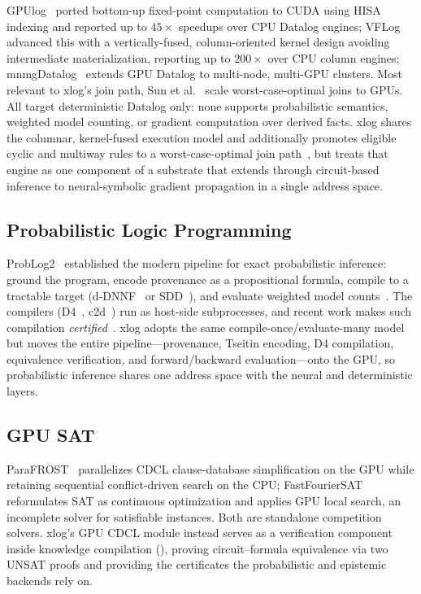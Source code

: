 GPUlog~\cite{gpulog} ported bottom-up fixed-point computation to CUDA using HISA indexing and reported up to $45\times$ speedups over CPU Datalog engines; VFLog~\cite{vflog} advanced this with a vertically-fused, column-oriented kernel design avoiding intermediate materialization, reporting up to $200\times$ over CPU column engines; mnmgDatalog~\cite{mnmgdatalog} extends GPU Datalog to multi-node, multi-GPU clusters. Most relevant to xlog's join path, Sun et al.~\cite{sungpuwcoj} scale worst-case-optimal joins to GPUs. All target deterministic Datalog only: none supports probabilistic semantics, weighted model counting, or gradient computation over derived facts. xlog shares the columnar, kernel-fused execution model and additionally promotes eligible cyclic and multiway rules to a worst-case-optimal join path~\cite{ngo2018wcoj,veldhuizen2014leapfrog,wang2023freejoin}, but treats that engine as one component of a substrate that extends through circuit-based inference to neural-symbolic gradient propagation in a single address space.

\subsection{Probabilistic Logic Programming}

ProbLog2~\cite{problog2} established the modern pipeline for exact probabilistic inference: ground the program, encode provenance as a propositional formula, compile to a tractable target (d-DNNF~\cite{darwiche2001dnnf} or SDD~\cite{sdd}), and evaluate weighted model counts~\cite{chaviraDarwiche2008}. The compilers (D4~\cite{d4compiler}, c2d~\cite{c2d}) run as host-side subprocesses, and recent work makes such compilation \emph{certified}~\cite{capelli2019}. xlog adopts the same compile-once/evaluate-many model but moves the entire pipeline---provenance, Tseitin encoding, D4 compilation, equivalence verification, and forward/backward evaluation---onto the GPU, so probabilistic inference shares one address space with the neural and deterministic layers.

\subsection{GPU SAT}

ParaFROST~\cite{parafrost} parallelizes CDCL clause-database simplification on the GPU while retaining sequential conflict-driven search on the CPU; FastFourierSAT~\cite{fastfouriersat} reformulates SAT as continuous optimization and applies GPU local search, an incomplete solver for satisfiable instances. Both are standalone competition solvers. xlog's GPU CDCL module instead serves as a verification component inside knowledge compilation (), proving circuit--formula equivalence via two UNSAT proofs and providing the certificates the probabilistic and epistemic backends rely on.

